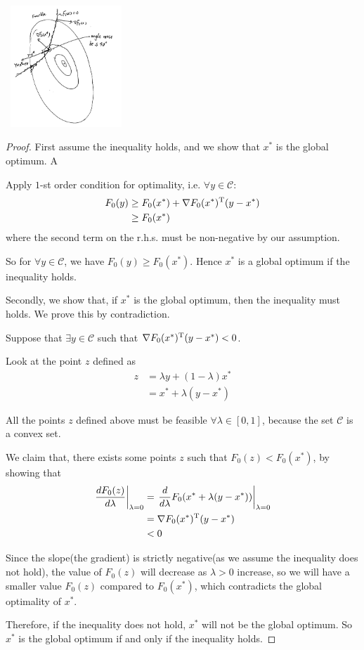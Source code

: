 \begin{marginfigure}
\centering
\includegraphics[width=1.8in,height=1.8in]{figures/ch09/figure1113_1.png}
\end{marginfigure}

\begin{proof}
	First assume the inequality holds, and we show that $x^*$ is the global optimum. A
	
	Apply $1$-st order condition for optimality, i.e. $\forall y \in \mathcal{C}$:
	\begin{align*}
	F_0(y) &\geq F_0(x^*) + \nabla F_0(x^*)^{{\rm T}}(y-x^*)\\
	&\geq F_0(x^*)
	\end{align*}
	where the second term on the r.h.s. must be non-negative by our assumption.
	
	So for $\forall y \in \mathcal{C}$, we have $F_0(y)\geq F_0(x^*)$. Hence $x^*$ is a global optimum if the inequality holds.
	
	Secondly, we show that, if $x^*$ is the global optimum, then the inequality must holds. We prove this by contradiction.
	
	Suppose that $\exists y\in \mathcal{C}$ such that $\nabla F_0(x^*)^{{\rm T}}(y-x^*)<0$.
	
	Look at the point $z$ defined as
	\begin{align*}
	z 
	&= \lambda y + (1-\lambda)x^*\\
	&= x^* + \lambda(y-x^*)
	\end{align*}
	
	All the points $z$ defined above must be feasible $\forall \lambda \in [0,1]$, because the set $\mathcal{C}$ is a convex set.
	
	We claim that, there exists some points $z$ such that $F_0(z)<F_0(x^*)$, by showing that
	\begin{align*}
	\left.\frac{dF_0(z)}{d\lambda}\right|_{\lambda = 0} &=\left.\frac{d}{d\lambda}F_0(x^*+\lambda(y-x^*))\right|_{\lambda = 0}\\
	&= \nabla F_0(x^*)^{{\rm T}}(y-x^*)\\
	&< 0
	\end{align*}
	
	Since the slope(the gradient) is strictly negative(as we assume the inequality does not hold), the value of $F_0(z)$ will decrease as $\lambda>0$ increase, so we will have a smaller value $F_0(z)$ compared to $F_0(x^*)$, which contradicts the global optimality of $x^*$.
	
	Therefore, if the inequality does not hold, $x^*$ will not be the global optimum. So $x^*$ is the global optimum if and only if the inequality holds.
\end{proof}



